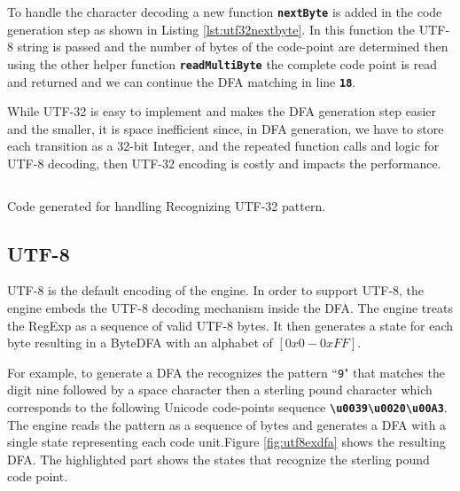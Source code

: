 To handle the character decoding a new function \texttt{\textbf{nextByte}} is added in the  code generation step as shown in Listing \ref{lst:utf32nextbyte}. In this function the UTF-8 string is passed and the number of bytes of the code-point are determined then using the other helper function \texttt{\textbf{readMultiByte}} the complete code point is read and returned and we can continue the DFA matching in line \texttt{\textbf{18}}.

While UTF-32 is easy to implement and makes the DFA generation step easier and the smaller, it is space inefficient since, in DFA generation, we have to store each transition as a 32-bit Integer, and the repeated function calls and logic for UTF-8 decoding, then UTF-32 encoding is costly and impacts the performance.
\begin{listing}[htbp]
\inputminted[breaklines=true,frame=lines,linenos]{cpp}{code/utf32.cpp}
\caption[Code generated for handling Recognizing UTF-32 pattern]{Code generated for handling Recognizing UTF-32 pattern.}
\label{lst:utf32nextbyte}
\end{listing}

\subsection{UTF-8}
UTF-8 is the default encoding of the engine. In order to support UTF-8, the engine embeds the UTF-8 decoding mechanism inside the DFA. The engine treats the RegExp as a sequence of valid UTF-8 bytes. It then generates a state for each byte resulting in a ByteDFA with an alphabet of $[0x0 - 0xFF]$.

For example, to generate a DFA the recognizes the pattern ``\texttt{9\textvisiblespace \textsterling}" that matches the digit nine followed by a space character then a sterling pound character which corresponds to the following Unicode code-points sequence \texttt{\textbf{\textbackslash u0039\textbackslash u0020\textbackslash u00A3}}. The engine reads the pattern as a sequence of bytes and generates a DFA with a single state representing each code unit.Figure \ref{fig:utf8exdfa} shows the resulting DFA. The highlighted part shows the states that recognize the sterling pound code point.

